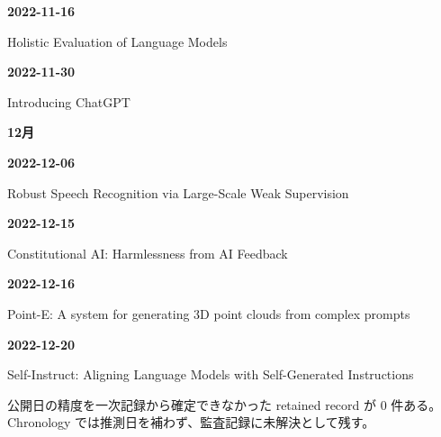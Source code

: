 \smallskip
\noindent\textbf{2022-11-16}\par
{\raggedright Holistic Evaluation of Language Models\,\cite{src-1e362767e63c}\par}
\smallskip
\noindent\textbf{2022-11-30}\par
{\raggedright Introducing ChatGPT\,\cite{src-bc1a61aec959}\par}
\smallskip
\medskip
\noindent\textbf{12月}\par
\smallskip
\noindent\textbf{2022-12-06}\par
{\raggedright Robust Speech Recognition via Large-Scale Weak Supervision\,\cite{src-7ef567047bd7}\par}
\smallskip
\noindent\textbf{2022-12-15}\par
{\raggedright Constitutional AI: Harmlessness from AI Feedback\,\cite{src-f4ecc26bd1e5}\par}
\smallskip
\noindent\textbf{2022-12-16}\par
{\raggedright Point-E: A system for generating 3D point clouds from complex prompts\,\cite{chron-28adad6ac48b}\par}
\smallskip
\noindent\textbf{2022-12-20}\par
{\raggedright Self-Instruct: Aligning Language Models with Self-Generated Instructions\,\cite{src-fadb2b92c538}\par}
\smallskip
\medskip
\begin{claimboundary}[日付精度の境界]
公開日の精度を一次記録から確定できなかった retained record が 0 件ある。Chronology では推測日を補わず、監査記録に未解決として残す。
\end{claimboundary}
